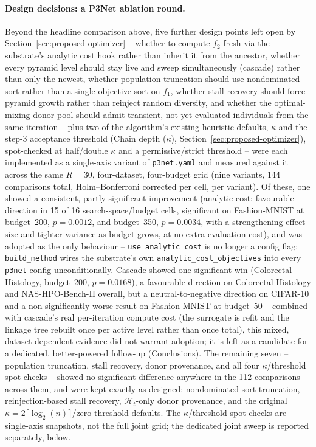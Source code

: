 \paragraph{Design decisions: a P3Net ablation round.} Beyond the headline comparison above, five further design points left open by
Section~\ref{sec:proposed-optimizer} -- whether to compute $f_2$ fresh via the substrate's analytic cost
hook rather than inherit it from the ancestor, whether every pyramid level should stay live and sweep
simultaneously (cascade) rather than only the newest, whether population truncation should use nondominated
sort rather than a single-objective sort on $f_1$, whether stall recovery should force pyramid growth rather
than reinject random diversity, and whether the optimal-mixing donor pool should admit transient,
not-yet-evaluated individuals from the same iteration -- plus two of the algorithm's existing heuristic
defaults, $\kappa$ and the step-3 acceptance threshold (Chain depth ($\kappa$),
Section~\ref{sec:proposed-optimizer}), spot-checked at half/double $\kappa$ and a permissive/strict
threshold -- were each implemented as a single-axis variant of \texttt{p3net.yaml} and measured against it
across the same $R=30$, four-dataset, four-budget grid (nine variants, 144 comparisons total,
Holm--Bonferroni corrected per cell, per variant). Of these, one showed a consistent, partly-significant
improvement (analytic cost: favourable direction in 15 of 16 search-space/budget cells, significant on
Fashion-MNIST at budget~200, $p=0.0012$, and budget~350, $p=0.0034$, with a strengthening effect size and
tighter variance as budget grows, at no extra evaluation cost), and was adopted as the only behaviour --
\texttt{use\_analytic\_cost} is no longer a config flag; \texttt{build\_method} wires the substrate's own
\texttt{analytic\_cost\_objectives} into every \texttt{p3net} config unconditionally. Cascade showed one
significant win (Colorectal-Histology, budget~200, $p=0.0168$), a favourable direction on
Colorectal-Histology and NAS-HPO-Bench-II overall, but a neutral-to-negative direction on CIFAR-10 and a
non-significantly worse result on Fashion-MNIST at budget~50 -- combined with cascade's real per-iteration
compute cost (the surrogate is refit and the linkage tree rebuilt once per active level rather than once
total), this mixed, dataset-dependent evidence did not warrant adoption; it is left as a candidate for a
dedicated, better-powered follow-up (Conclusions). The remaining seven -- population truncation, stall
recovery, donor provenance, and all four $\kappa$/threshold spot-checks -- showed no significant difference
anywhere in the 112 comparisons across them, and were kept exactly as designed: nondominated-sort truncation,
reinjection-based stall recovery, $\mathcal{H}_t$-only donor provenance, and the original
$\kappa=2\lceil\log_2(n)\rceil$/zero-threshold defaults. The $\kappa$/threshold spot-checks are single-axis
snapshots, not the full joint grid; the dedicated joint sweep is reported separately, below.

